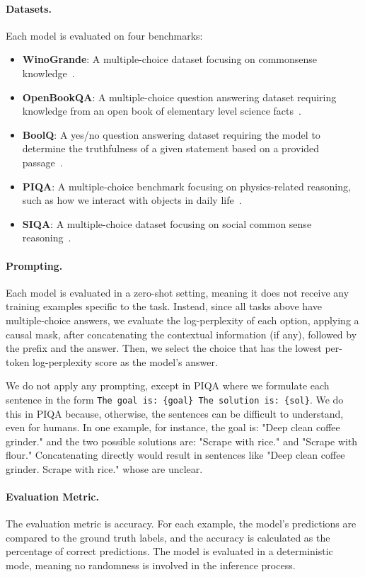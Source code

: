 \paragraph{Datasets.} Each model is evaluated on four benchmarks:
\begin{itemize}
    \item \textbf{WinoGrande}: A multiple-choice dataset focusing on  commonsense knowledge~\cite{sakaguchi2019winogrande}.
    \item \textbf{OpenBookQA}: A multiple-choice question answering dataset requiring knowledge from an open book of elementary level science facts~\cite{mihaylov2018can}.
    \item \textbf{BoolQ}: A yes/no question answering dataset requiring the model to determine the truthfulness of a given statement based on a provided passage~\cite{clark2019boolq}.
    \item \textbf{PIQA}: A multiple-choice benchmark focusing on physics-related reasoning, such as how we interact with objects in daily life~\cite{Bisk2020}.
    \item \textbf{SIQA}: A multiple-choice dataset focusing on social common sense reasoning~\cite{sap2019socialiqacommonsensereasoningsocial}.
\end{itemize}

\paragraph{Prompting.} Each model is evaluated in a zero-shot setting, meaning it does not receive any training examples specific to the task. Instead, since all tasks above have multiple-choice answers, we evaluate the log-perplexity of each option, applying a causal mask, after concatenating the contextual information (if any), followed by the prefix and the answer. Then, we select the choice that has the lowest per-token log-perplexity score as the model's answer. 

We do not apply any prompting, except in PIQA where we formulate each sentence in the form \verb|The goal is: {goal} The solution is: {sol}|. We do this in PIQA because, otherwise, the sentences can be difficult to understand, even for humans. In one example, for instance, the goal is: "Deep clean coffee grinder." and  the two possible solutions are: "Scrape with rice." and "Scrape with flour." Concatenating directly would result in sentences like "Deep clean coffee grinder. Scrape with rice." whose are unclear.

\paragraph{Evaluation Metric.} 
The  evaluation metric is accuracy. For each example, the model's predictions are compared to the ground truth labels, and the accuracy is calculated as the percentage of correct predictions. The model is evaluated in a deterministic mode, meaning no randomness is involved in the inference process.


